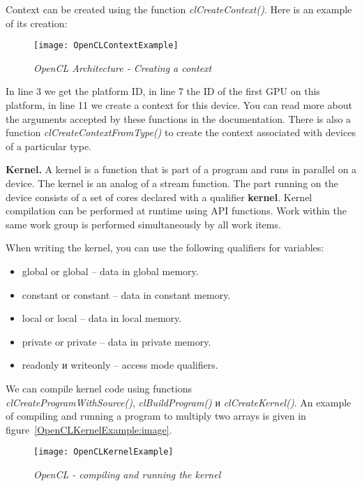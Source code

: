 {Context can be created using the function \textit{clCreateContext()}. Here is an example of its creation:
	\begin{figure}[H]
		\texttt{[image: OpenCLContextExample]}
		\caption{\textit{OpenCL Architecture - Creating a context}}
		\label{OpenCLContextExample:image}
	\end{figure}
In line 3 we get the platform ID, in line 7 the ID of the first GPU on this platform, in line 11 we create a context for this device. You can read more about the arguments accepted by these functions in the documentation. There is also a function \textit{clCreateContextFromType()} to create the context associated with devices of a particular type.
	\par\textbf{Kernel.} A kernel is a function that is part of a program and runs in parallel on a device. The kernel is an analog of a stream function. The part running on the device consists of a set of cores declared with a qualifier \textbf{\textunderscore \textunderscore kernel}. Kernel compilation can be performed at runtime using API functions. Work within the same work group is performed simultaneously by all work items.
	\par When writing the kernel, you can use the following qualifiers for variables:
		\begin{itemize}
			\item\textunderscore \textunderscore global or global – data in global memory.
			\item\textunderscore \textunderscore constant or constant – data in constant memory.
			\item\textunderscore \textunderscore local or local – data in local memory.
			\item\textunderscore \textunderscore private or private – data in private memory.
			\item\textunderscore \textunderscore read\textunderscore only и \textunderscore \textunderscore write\textunderscore only – access mode qualifiers.
		\end{itemize}
	\par We can compile kernel code using functions \\ \textit{clCreateProgramWithSource()}, \textit{clBuildProgram()} и \textit{clCreateKernel()}. An example of compiling and running a program to multiply two arrays is given in figure~\ref{OpenCLKernelExample:image}.
	\begin{figure}[H]
		\texttt{[image: OpenCLKernelExample]}
		\caption{\textit{OpenCL - compiling and running the kernel}}

\end{figure}}
